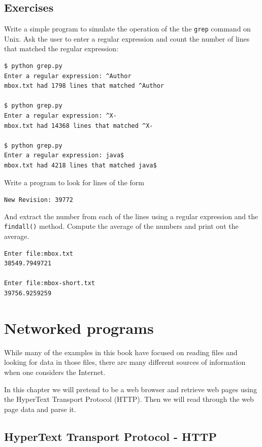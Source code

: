 \documentclass[11pt]{book}
\begin{document}
\section{Exercises}

\begin{ex}
Write a simple program to simulate the operation of the the {\tt grep} command 
on Unix.  Ask the user to enter a regular expression and count the number
of lines that matched the regular expression:

\beforeverb
\begin{verbatim}
$ python grep.py
Enter a regular expression: ^Author
mbox.txt had 1798 lines that matched ^Author

$ python grep.py
Enter a regular expression: ^X-
mbox.txt had 14368 lines that matched ^X-

$ python grep.py
Enter a regular expression: java$
mbox.txt had 4218 lines that matched java$
\end{verbatim}
\afterverb
%
\end{ex}

\begin{ex}
Write a program to look for lines of the form

\verb"New Revision: 39772"

And extract the number from each of the lines using a regular expression
and the {\tt findall()} method.  Compute the average of the numbers and 
print out the average.

\beforeverb
\begin{verbatim}
Enter file:mbox.txt 
38549.7949721

Enter file:mbox-short.txt
39756.9259259
\end{verbatim}
\afterverb
%

\end{ex}

\chapter{Networked programs}

While many of the examples in this book have focused on reading
files and looking for data in those files, there are many different
sources of information when one considers the Internet.

In this chapter we will pretend to be a web browser and retrieve web
pages using the HyperText Transport Protocol (HTTP).  Then we will read
through the web page data and parse it.

\section{HyperText Transport Protocol - HTTP}
\end{document}

